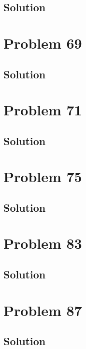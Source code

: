 \documentclass[12pt]{article}
\begin{document}
        \subsection{Solution}

    \pagebreak
    \section{Problem 69}

        \subsection{Solution}

    \pagebreak
    \section{Problem 71}

        \subsection{Solution}

    \pagebreak
    \section{Problem 75}

        \subsection{Solution}

    \pagebreak
    \section{Problem 83}

        \subsection{Solution}

    \pagebreak
    \section{Problem 87}

        \subsection{Solution}

    \pagebreak
\end{document}
